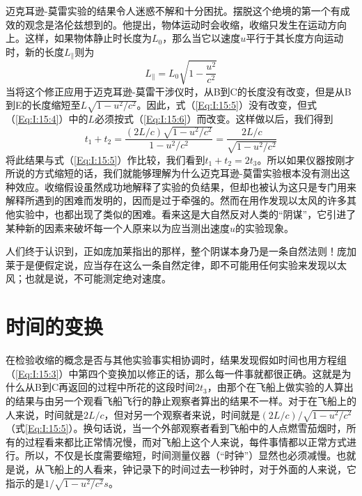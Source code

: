 迈克耳逊-莫雷实验的结果令人迷惑不解和十分困扰。摆脱这个绝境的第一个有成效的观念是洛伦兹想到的。他提出，物体运动时会收缩，收缩只发生在运动方向上。这样，如果物体静止时长度为$L_0$，那么当它以速度$u$平行于其长度方向运动时，新的长度$L_\parallel$则为
\begin{equation}
    \label{Eq:I:15:6}
    L_\parallel = L_0 \sqrt{1-\frac{u^2}{c^2}}
\end{equation}
当将这个修正应用于迈克耳逊-莫雷干涉仪时，从B到C的长度没有改变，但是从B到E的长度缩短至$L\sqrt{1-u^2/c^2}$。因此，式（\ref{Eq:I:15:5}）没有改变，但式（\ref{Eq:I:15:4}）中的$L$必须按式（\ref{Eq:I:15:6}）而改变。这样做以后，我们得到
\begin{equation}
    \label{Eq:I:15:7}
    t_1 + t_2 = \frac{(2L/c)\sqrt{1-u^2/c^2}}{1-u^2/c^2}=\frac{2L/c}{\sqrt{1-u^2/c^2}}
\end{equation}
将此结果与式（\ref{Eq:I:15:5}）作比较，我们看到$t_1+t_2=2t_3$。所以如果仪器按刚才所说的方式缩短的话，我们就能够理解为什么迈克耳逊-莫雷实验根本没有测出这种效应。收缩假设虽然成功地解释了实验的负结果，但却也被认为这只是专门用来解释所遇到的困难而发明的，因而是过于牵强的。然而在用作发现以太风的许多其他实验中，也都出现了类似的困难。看来这是大自然反对人类的“阴谋”，它引进了某种新的因素来破坏每一个人原来以为应当测出速度$u$的实验现象。

人们终于认识到，正如庞加莱指出的那样，整个阴谋本身乃是一条自然法则！庞加莱于是便假定说，应当存在这么一条自然定律，即不可能用任何实验来发现以太风；也就是说，不可能测定绝对速度。

\section{时间的变换}

在检验收缩的概念是否与其他实验事实相协调时，结果发现假如时间也用方程组（\ref{Eq:I:15:3}）中第四个变换加以修正的话，那么每一件事就都很正确。这就是为什么从B到C再返回的过程中所花的这段时间$2t_3$，由那个在飞船上做实验的人算出的结果与由另一个观看飞船飞行的静止观察者算出的结果不一样。对于在飞船上的人来说，时间就是$2L/c$，但对另一个观察者来说，时间就是$(2L/c)/\sqrt{1-u^2/c^2}$（式\ref{Eq:I:15:5}）。换句话说，当一个外部观察者看到飞船中的人点燃雪茄烟时，所有的过程看来都比正常情况慢，而对飞船上这个人来说，每件事情都以正常方式进行。所以，不仅是长度需要缩短，时间测量仪器（“时钟”）显然也必须减慢。也就是说，从飞船上的人看来，钟记录下的时间过去一秒钟时，对于外面的人来说，它指示的是$1/\sqrt{1-u^2/c^2}s$。

